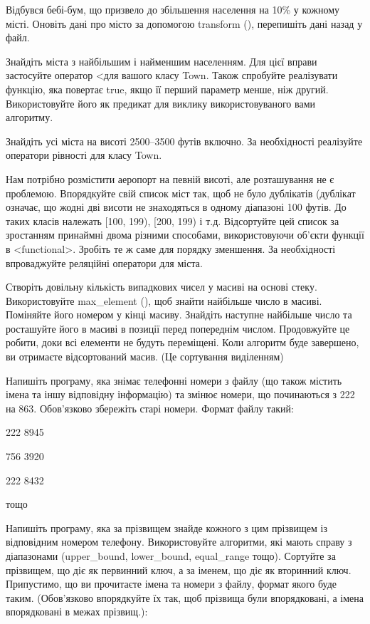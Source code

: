 \documentclass[]{article}
\begin{document}
\begin{enumerate}
Відбувся бебі-бум, що призвело до збільшення населення на 10\% у кожному
місті. Оновіть дані про місто за допомогою transform (), перепишіть дані
назад у файл.

Знайдіть міста з найбільшим і найменшим населенням. Для цієї вправи
застосуйте оператор \textless{}для вашого класу Town. Також спробуйте
реалізувати функцію, яка повертає true, якщо її перший параметр менше,
ніж другий. Використовуйте його як предикат для виклику
використовуваного вами алгоритму.

Знайдіть усі міста на висоті 2500--3500 футів включно. За необхідності
реалізуйте оператори рівності для класу Town.

Нам потрібно розмістити аеропорт на певній висоті, але розташування не є
проблемою. Впорядкуйте свій список міст так, щоб не було дублікатів
(дублікат означає, що жодні дві висоти не знаходяться в одному діапазоні
100 футів. До таких класів належать {[}100, 199), {[}200, 199) і т.д.
Відсортуйте цей список за зростанням принаймні двома різними способами,
використовуючи об'єкти функції в \textless{}functional\textgreater{}.
Зробіть те ж саме для порядку зменшення. За необхідності впроваджуйте
реляційні оператори для міста.

Створіть довільну кількість випадкових чисел у масиві на основі стеку.
Використовуйте max\_element (), щоб знайти найбільше число в масиві.
Поміняйте його номером у кінці масиву. Знайдіть наступне найбільше число
та росташуйте його в масиві в позиції перед попереднім числом.
Продовжуйте це робити, доки всі елементи не будуть переміщені. Коли
алгоритм буде завершено, ви отримаєте відсортований масив. (Це
сортування виділенням)

Напишіть програму, яка знімає телефонні номери з файлу (що також містить
імена та іншу відповідну інформацію) та змінює номери, що починаються з
222 на 863. Обов'язково збережіть старі номери. Формат файлу такий:

222 8945

756 3920

222 8432

тощо

Напишіть програму, яка за прізвищем знайде кожного з цим прізвищем із
відповідним номером телефону. Використовуйте алгоритми, які мають справу
з діапазонами (upper\_bound, lower\_bound, equal\_range тощо). Сортуйте
за прізвищем, що діє як первинний ключ, а за іменем, що діє як вторинний
ключ. Припустимо, що ви прочитаєте імена та номери з файлу, формат якого
буде таким. (Обов'язково впорядкуйте їх так, щоб прізвища були
впорядковані, а імена впорядковані в межах прізвищ.):


\end{enumerate}
\end{document}
